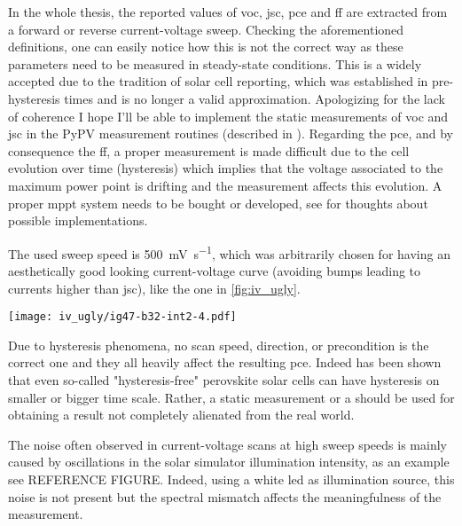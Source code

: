 			In the whole thesis, the reported values of \gls{voc}, \gls{jsc}, \gls{pce} and \gls{ff} are extracted from a forward or reverse current-voltage sweep. Checking the aforementioned definitions, one can easily notice how this is not the correct way as these parameters need to be measured in steady-state conditions. This is a widely accepted due to the tradition of solar cell reporting, which was established in pre-hysteresis times and is no longer a valid approximation. Apologizing for the lack of coherence I hope I'll be able to implement the static measurements of \gls{voc} and \gls{jsc} in the PyPV measurement routines (described in ). Regarding the \gls{pce}, and by consequence the \gls{ff}, a proper measurement is made difficult due to the cell evolution over time (hysteresis) which implies that the voltage associated to the maximum power point is drifting and the measurement affects this evolution. A proper \gls{mppt} system needs to be bought or developed, see  for thoughts about possible implementations.

			The used sweep speed is \SI{500}{\mV\per\s}, which was arbitrarily chosen for having an aesthetically good looking current-voltage curve (avoiding bumps leading to currents higher than \gls{jsc}), like the one in \cref{fig:iv_ugly}.

			\begin{SCfigure}%
				\centering
				\texttt{[image: iv\_ugly/ig47-b32-int2-4.pdf]}
				\label{fig:iv_ugly}
			\end{SCfigure}

			Due to hysteresis phenomena, no scan speed, direction, or precondition is the correct one and they all heavily affect the resulting \gls{pce}. Indeed has been shown that even so-called "hysteresis-free" perovskite solar cells can have hysteresis on smaller or bigger time scale\cite{Jacobs2018}. Rather, a static measurement or a  should be used for obtaining a result not completely alienated from the real world.

			The noise often observed in current-voltage scans at high sweep speeds is mainly caused by oscillations in the solar simulator illumination intensity, as an example see REFERENCE FIGURE. Indeed, using a white \gls{led} as illumination source, this noise is not present but the spectral mismatch affects the meaningfulness of the measurement.

